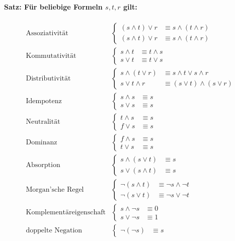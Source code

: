 \documentclass[10pt,a4paper]{article}
\begin{document}
\paragraph{Satz: Für beliebige Formeln $s,t,r$ gilt:}
\begin{align*}
\text{Assoziativität}&\begin{cases}
(s \land t) \lor r &\equiv s \land (t \land r)\\
(s \land t) \lor r &\equiv s \land (t \land r)
\end{cases} \\
%
\text{Kommutativität}&\begin{cases}
s \land t &\equiv t \land s\\
s \lor t &\equiv t \lor s
\end{cases} \\
%
\text{Distributivität}&\begin{cases}
s \land (t \lor r) &\equiv s \land t \lor s \land r\\
s \lor t \land r &\equiv (s \lor t) \land (s \lor r)
\end{cases} \\
%
\text{Idempotenz}&\begin{cases}
s \land s &\equiv s \\
s \lor s &\equiv s
\end{cases} \\
%
\text{Neutralität}&\begin{cases}
t \land s &\equiv s \\
f \lor s &\equiv s
\end{cases} \\
%
\text{Dominanz}&\begin{cases}
f \land s &\equiv s \\
t \lor s &\equiv s
\end{cases} \\
%
\text{Absorption}&\begin{cases}
s \land (s \lor t) &\equiv s \\
s \lor (s \land t) &\equiv s
\end{cases} \\
%
\text{Morgan'sche Regel}&\begin{cases}
\neg (s \land t) &\equiv \neg s \land \neg t\\
\neg (s \lor t) &\equiv \neg s \lor \neg t
\end{cases} \\
%
\text{Komplementäreigenschaft}&\begin{cases}
s \land \neg s &\equiv 0 \\
s \lor \neg s &\equiv 1
\end{cases} \\
%
\text{doppelte Negation}&\begin{cases}
\neg (\neg s) &\equiv s
\end{cases} \\
\end{align*}
%
\end{document}
